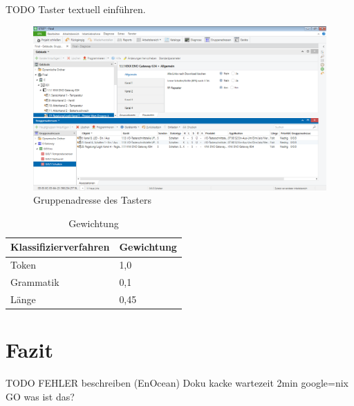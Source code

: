 \documentclass[a4paper]{article}
\newcommand*{\thead}[1]{\multicolumn{1}{c}{\bfseries #1}}
\begin{document}
TODO Taster textuell einführen.

\begin{figure}[h!]
	\centering
	\includegraphics[width=13cm]{Doku/19}
	\caption{Gruppenadresse des Tasters}
	\label{fig:19}
\end{figure}

\begin{table}[h!]
\centering
\begin{tabular}{|l|l|}
\thead{Klassifizierverfahren} & \thead{Gewichtung}\\\hline
Token & 1,0\\\hline
Grammatik & 0,1\\\hline
Länge & 0,45\\\hline
\end{tabular}
\caption{Gewichtung}
\label{tab:weights}
\end{table}
\section{Fazit}
TODO FEHLER beschreiben (EnOcean)
Doku kacke
wartezeit 2min
google=nix
GO was ist das?
\end{document}
